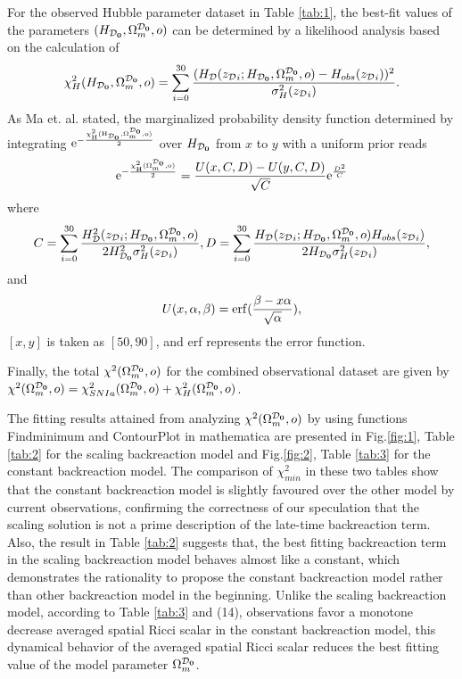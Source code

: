 \documentclass[preprint,preprintnumbers, prd, floatfix,  superscriptaddress,nofootinbib] {revtex4-1}
\newcommand{\CD}{{\cal D}}
\newcommand{\now}[1]{{#1_{\rm \bf 0}}}
\begin{document}
For the observed Hubble parameter dataset in Table \ref{tab:1}, the best-fit values of the parameters $(H_{\now\CD},\Omega_{m}^{\now\CD},o)$ can be determined by a likelihood analysis based on the calculation of
\begin{equation}
 \chi^{2}_H(H_{\now\CD},\Omega_{m}^{\now\CD},o)=\sum_{i=0}^{30} \frac{(H_{\CD}({z_{\CD}}_{i};H_{\now\CD},\Omega_{m}^{\now\CD},o)-H_{obs}({z_{\CD}}_{i}))^2}{\sigma_{H}^{2}({z_{\CD}}_{i})}.
\end{equation}
As Ma et. al.\cite{ma2011power} stated, the marginalized probability density function determined by integrating $ \rm e^{-\frac{\chi^{2}_H(H_{\now\CD},\Omega_{m}^{\now\CD},o)}{2}} $ over $H_{\now\CD}$ from $x$ to $y$  with a uniform prior reads
\begin{equation}
  {\rm e^{-\frac{\chi^{2}_H(\Omega_{m}^{\now\CD},o)}{2}}} = \frac{U(x,C,D)-U(y,C,D)}{\sqrt{C}}{\rm e}^{\frac{D^2}{C}}
\end{equation}
where
\begin{equation}
  C=\sum_{i=0}^{30}\frac{H_{\CD}^2({z_{\CD}}_{i};H_{\now\CD},\Omega_{m}^{\now\CD},o)}{2H_{\now\CD}^2\sigma_{H}^{2}({z_{\CD}}_{i})}, D=\sum_{i=0}^{30}\frac{H_{\CD}({z_{\CD}}_{i};H_{\now\CD},\Omega_{m}^{\now\CD},o)H_{obs}({z_{\CD}}_{i})}{2H_{\now\CD}\sigma_{H}^{2}({z_{\CD}}_{i})},
\end{equation}
and
\begin{equation*}
  U(x,\alpha,\beta)={\rm erf}(\frac{\beta-x\alpha}{\sqrt{\alpha}}),
\end{equation*}
$[x,y]$ is taken as $[50,90]$, and erf represents the error function.

Finally, the total $\chi^{2}(\Omega_{m}^{\now\CD},o)$ for the combined observational dataset are given by $\chi^{2}(\Omega_{m}^{\now\CD},o)=\chi_{SN Ia}^{2}(\Omega_{m}^{\now\CD},o)+\chi_{H}^{2}(\Omega_{m}^{\now\CD},o)$.

The fitting results attained from analyzing $\chi^{2}(\Omega_{m}^{\now\CD},o)$ by using functions Findminimum and ContourPlot in mathematica are presented in Fig.\ref{fig:1}, Table \ref{tab:2} for the scaling backreaction model and Fig.\ref{fig:2}, Table \ref{tab:3} for the constant backreaction model. The comparison of $\chi^{2}_{min}$ in these two tables show that the constant backreaction model is slightly favoured over the other model by current observations, confirming the correctness of our speculation that the scaling solution is not a prime description of the late-time backreaction term. Also, the result in Table \ref{tab:2} suggests that, the best fitting backreaction term in the scaling backreaction model behaves almost like a constant, which demonstrates the rationality to propose the constant backreaction model rather than other backreaction model in the beginning. Unlike the scaling backreaction model, according to Table \ref{tab:3} and (14), observations favor a monotone decrease averaged spatial Ricci scalar in the constant backreaction model, this dynamical behavior of the averaged spatial Ricci scalar reduces the best fitting value of the model parameter $\Omega_{m}^{\now\CD}$.
\end{document}
